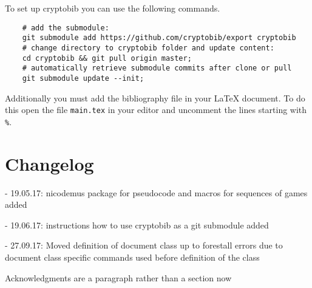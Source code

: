 To set up cryptobib you can use the following commands.
\begin{verbatim}
	# add the submodule:
	git submodule add https://github.com/cryptobib/export cryptobib
	# change directory to cryptobib folder and update content:
	cd cryptobib && git pull origin master;
	# automatically retrieve submodule commits after clone or pull
	git submodule update --init;
\end{verbatim}

Additionally you must add the bibliography file in your \LaTeX{} document.
To do this open the file \verb|main.tex| in your editor and uncomment the lines starting with \verb|%|.

\section{Changelog}


- 19.05.17: nicodemus package for pseudocode and macros for sequences of games added

\noindent - 19.06.17: instructions how to use cryptobib as a git submodule added

\noindent - 27.09.17: Moved definition of document class up to forestall errors due to document class specific commands used before definition of the class

Acknowledgments are a paragraph rather than a section now
